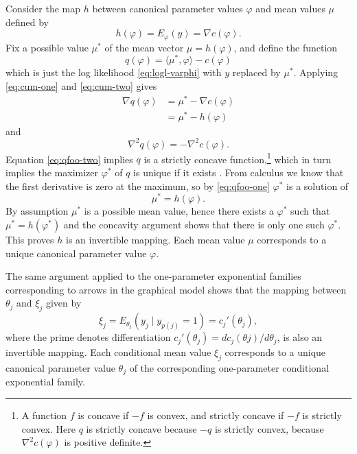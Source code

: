 \documentclass[11pt]{article}
\newcommand{\inner}[1]{\langle #1 \rangle}
\begin{document}
Consider the map $h$ between canonical parameter values $\varphi$ and mean
values $\mu$ defined by
$$
   h(\varphi) = E_\varphi(y) = \nabla c(\varphi).
$$
Fix a possible value $\mu^*$ of the mean vector $\mu = h(\varphi)$,
and define the function
\begin{equation} \label{eq:qfoo-zero}
   q(\varphi) = \inner{\mu^*, \varphi} - c(\varphi)
\end{equation}
which is just the log likelihood \eqref{eq:logl-varphi} with $y$ replaced by
$\mu^*$.  Applying \eqref{eq:cum-one} and \eqref{eq:cum-two} gives
\begin{equation} \label{eq:qfoo-one}
\begin{split}
   \nabla q(\varphi)
   & =
   \mu^* - \nabla c(\varphi)
   \\
   & =
   \mu^* - h(\varphi)
\end{split}
\end{equation}
and
\begin{equation} \label{eq:qfoo-two}
   \nabla^2 q(\varphi) = - \nabla^2 c(\varphi).
\end{equation}
Equation \eqref{eq:qfoo-two} implies $q$ is
a strictly concave function,\footnote{A function $f$ is concave if $- f$ is
convex, and strictly concave if $- f$ is strictly convex.  Here $q$ is
strictly concave because $- q$ is strictly convex,
because $\nabla^2 c(\varphi)$ is positive definite.}
which in turn implies the maximizer $\varphi^*$ of $q$ is unique if it
exists \citep[Theorem~2.6]{raw}.  From calculus we know that the first
derivative is zero at the maximum, so by \eqref{eq:qfoo-one} $\varphi^*$
is a solution of
$$
   \mu^* = h(\varphi).
$$
By assumption $\mu^*$ is a possible mean value, hence there exists
a $\varphi^*$ such that $\mu^* = h(\varphi^*)$ and the concavity argument
shows that there is only one such $\varphi^*$.  This proves $h$ is an
invertible mapping.  Each mean value $\mu$ corresponds to a unique
canonical parameter value $\varphi$.

The same argument applied to the one-parameter exponential families
corresponding to arrows in the graphical model shows
that the mapping between $\theta_j$ and $\xi_j$ given by
$$
   \xi_j = E_{\theta_j}(y_j \mid y_{p(j)} = 1) = c_j'(\theta_j),
$$
where the prime denotes
differentiation $c_j'(\theta_j) = d c_j(\theta j) / d \theta_j$,
is also an invertible mapping.  Each conditional mean value
$\xi_j$ corresponds to a unique canonical parameter value $\theta_j$ of
the corresponding one-parameter conditional exponential family.
\end{document}
